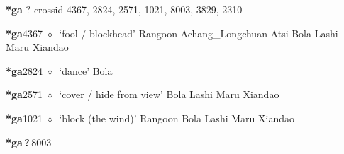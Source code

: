 \item
\textbf{*ga}
?
  {\tiny crossid 4367, 2824, 2571, 1021, 8003, 3829, 2310}
  \begin{list}{}{\leftmargin=1.5em \itemindent=-1.5em}
  \item {\footnotesize \textbf{*ga}}{\tiny 4367}
         $\diamond$~`fool / blockhead'
         Rangoon 
\hspace{1ex}
         Achang\_Longchuan 
\hspace{1ex}
         Atsi 
\hspace{1ex}
         Bola 
\hspace{1ex}
         Lashi 
\hspace{1ex}
         Maru 
\hspace{1ex}
         Xiandao 
  \item {\footnotesize \textbf{*ga}}{\tiny 2824}
\hspace{1ex}
         $\diamond$~`dance'
         Bola 
  \item {\footnotesize \textbf{*ga}}{\tiny 2571}
\hspace{1ex}
         $\diamond$~`cover / hide from view'
         Bola 
\hspace{1ex}
         Lashi 
\hspace{1ex}
         Maru 
\hspace{1ex}
         Xiandao 
  \item {\footnotesize \textbf{*ga}}{\tiny 1021}
\hspace{1ex}
         $\diamond$~`block (the wind)'
         Rangoon 
\hspace{1ex}
         Bola 
\hspace{1ex}
         Lashi 
\hspace{1ex}
         Maru 
\hspace{1ex}
         Xiandao 
  \item {\footnotesize \textbf{*ga\,?\,}}{\tiny 8003}

\end{list}
